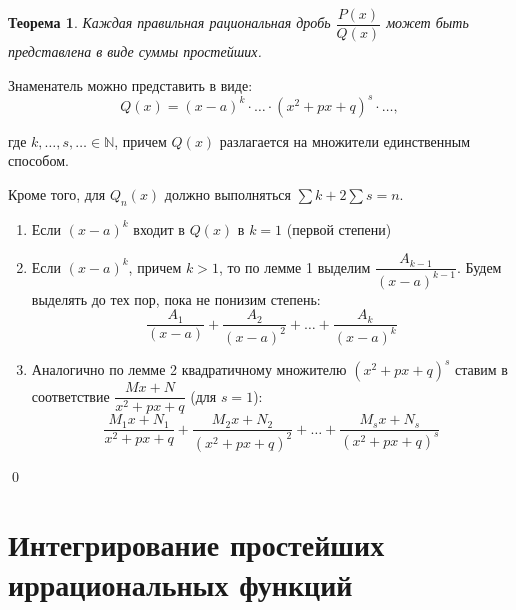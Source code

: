 \documentclass[a4paper,12pt,oneside]{extbook}
\theoremstyle{numbered}
\theoremstyle{unnumbered}
\theoremstyle{named}
\newtheorem{theorem}{Теорема}[section]
\theoremstyle{unnumbered}
\theoremstyle{named}
\theoremstyle{named}
\theoremstyle{named}
\renewenvironment{proof}{{\noindent\textbf{Доказательство.}}}{\qed}
\begin{document}
\begin{theorem}
    Каждая правильная рациональная дробь \(\dfrac{P(x)}{Q(x)}\) может быть представлена в виде суммы простейших.
\end{theorem}

\begin{proof}
    Знаменатель можно представить в виде:
    \[
        Q(x) = (x - a)^k \cdot \ldots \cdot (x^2 + px + q)^s \cdot \ldots,
    \]

    где \(k, \ldots, s, \ldots \in \mathbb{N}\), причем \(Q(x)\) разлагается на множители единственным способом.

    Кроме того, для \(Q_n(x)\) должно выполняться \(\sum k + 2\sum s = n\).

    \begin{enumerate}
        \item {Если \((x - a)^k\) входит в \(Q(x)\) в \(k = 1\) (первой степени)}
        \item {
              Если \((x - a)^k\), причем \(k > 1\), то по лемме 1 выделим \(\dfrac{A_{k - 1}}{(x - a)^{k - 1}}\).
              Будем выделять до тех пор, пока не понизим степень:
              \[
                  \frac{A_1}{(x - a)} + \frac{A_2}{(x - a)^2} + \ldots + \frac{A_k}{(x - a)^k}
              \]
              }
        \item {
              Аналогично по лемме 2 квадратичному множителю \((x^2 + px + q)^s\) ставим в соответствие \(\dfrac{Mx + N}{x^2 + px +q}\) (для \(s = 1\)):
              \[
                  \frac{M_1x + N_1}{x^2 + px + q} + \frac{M_2x + N_2}{(x^2 + px + q)^2} + \ldots + \frac{M_sx + N_s}{(x^2 + px + q)^s}
              \]
              }
    \end{enumerate}
\end{proof}


\section{Интегрирование простейших иррациональных функций}%
\label{sec:Интегрирование простейших иррациональных функций}
\end{document}
